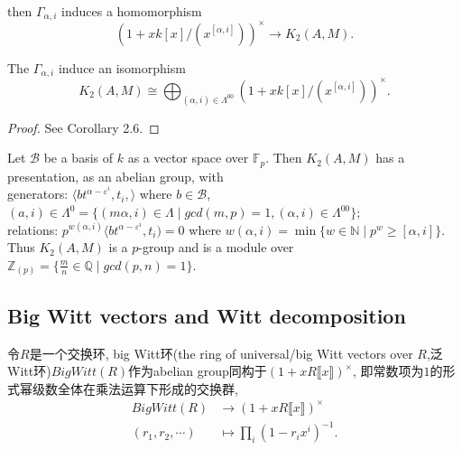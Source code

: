 then $\Gamma_{\alpha,i}$ induces a homomorphism
\[(1+xk[x]/(x^{[\alpha,i]}))^{\times} \longrightarrow K_2(A,M).\]
\begin{theorem}
\label{K2(A,M)}
	The $\Gamma_{\alpha,i}$ induce an isomorphism
\[ K_2(A,M)\cong \bigoplus_{(\alpha,i)\in\Lambda^{00}}(1+xk[x]/(x^{[\alpha,i]}))^{\times}.\]
\end{theorem}
\begin{proof}
	See \cite{MR86f:18017} Corollary 2.6. 
\end{proof}
\begin{corollary}
	Let $\mathcal{B}$ be a basis of  $k$  as a vector space over $\mathbb{F}_p$. Then $K_2(A, M)$ has
a presentation, as an abelian group, with\\
generators: $\langle b t^{\alpha-\varepsilon^i},t_i,\rangle$ where $b \in \mathcal{B}$, $(a, i) \in \Lambda^0 = \{(m\alpha,i)\in \Lambda \mid gcd(m,p)=1, (\alpha,i)\in \Lambda^{00}\}$;\\
relations: $p^{w(\alpha,i)}\langle bt^{\alpha-\varepsilon^i},t_i) = 0$ where $w(\alpha,i)=\min\{w\in \mathbb{N} \mid p^w \geq [\alpha,i]\}$.\\
Thus $K_2(A,M)$ is a $p$-group and is a module over $\mathbb{Z}_{(p)}=\{\frac{m}{n}\in \mathbb{Q}\mid gcd(p,n)=1\}$.
\end{corollary}


\subsection{Big Witt vectors and Witt decomposition}
令$R$是一个交换环, big Witt环(the ring of universal/big Witt vectors over $R$,泛Witt环)$BigWitt(R)$作为abelian group同构于$(1+xR\llbracket x\rrbracket )^{\times}$, 即常数项为$1$的形式幂级数全体在乘法运算下形成的交换群, 
\begin{align*}
BigWitt(R) &\longrightarrow (1+xR\llbracket x\rrbracket )^{\times}\\
(r_1,r_2,\cdots) & \mapsto \prod_i(1-r_i x^i)^{-1}.
\end{align*}



